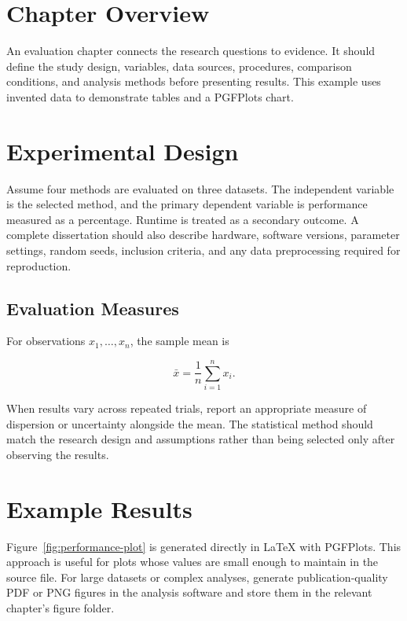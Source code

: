 \section{Chapter Overview}

An evaluation chapter connects the research questions to evidence. It should define the study design, variables, data sources, procedures, comparison conditions, and analysis methods before presenting results. This example uses invented data to demonstrate tables and a PGFPlots chart.

\section{Experimental Design}

Assume four methods are evaluated on three datasets. The independent variable is the selected method, and the primary dependent variable is performance measured as a percentage. Runtime is treated as a secondary outcome. A complete dissertation should also describe hardware, software versions, parameter settings, random seeds, inclusion criteria, and any data preprocessing required for reproduction.

\subsection{Evaluation Measures}

For observations \(x_1,\ldots,x_n\), the sample mean is

\begin{equation}
\label{eq:sample-mean}
\bar{x}=\frac{1}{n}\sum_{i=1}^{n}x_i.
\end{equation}

When results vary across repeated trials, report an appropriate measure of dispersion or uncertainty alongside the mean. The statistical method should match the research design and assumptions rather than being selected only after observing the results.

\section{Example Results}

Figure~\ref{fig:performance-plot} is generated directly in LaTeX with PGFPlots. This approach is useful for plots whose values are small enough to maintain in the source file. For large datasets or complex analyses, generate publication-quality PDF or PNG figures in the analysis software and store them in the relevant chapter's figure folder.

